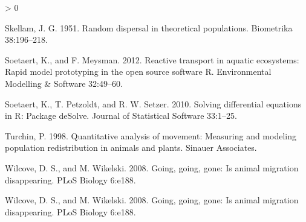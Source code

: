 \documentclass[12pt]{article}
\newlength{\cslhangindent}
\newenvironment{CSLReferences}[2] %
 {%
  \setlength{\parindent}{0pt}
  \ifodd #1 \everypar{\setlength{\hangindent}{\cslhangindent}}\ignorespaces\fi
  \ifnum #2 > 0
  \setlength{\parskip}{#2\baselineskip}
  \fi
 }%
 {}
\begin{document}
\begin{CSLReferences}{1}{0}
\leavevmode\hypertarget{ref-Skellam1951}{}%
Skellam, J. G. 1951. Random dispersal in theoretical populations.
Biometrika 38:196--218.

\leavevmode\hypertarget{ref-Soetaert2012}{}%
Soetaert, K., and F. Meysman. 2012. {Reactive transport in aquatic
ecosystems: Rapid model prototyping in the open source software R}.
Environmental Modelling \& Software 32:49--60.

\leavevmode\hypertarget{ref-Soetaert2010}{}%
Soetaert, K., T. Petzoldt, and R. W. Setzer. 2010. Solving differential
equations in {R}: Package de{S}olve. Journal of Statistical Software
33:1--25.

\leavevmode\hypertarget{ref-Turchin1998}{}%
Turchin, P. 1998. Quantitative analysis of movement: Measuring and
modeling population redistribution in animals and plants. Sinauer
Associates.

\leavevmode\hypertarget{ref-Wilcove2008}{}%
Wilcove, D. S., and M. Wikelski. 2008. Going, going, gone: Is animal
migration disappearing. {PLoS} Biology 6:e188.

\leavevmode\hypertarget{ref-Wilcove2008}{}%
Wilcove, D. S., and M. Wikelski. 2008. Going, going, gone: Is animal
migration disappearing. {PLoS} Biology 6:e188.

\end{CSLReferences}
\end{document}

